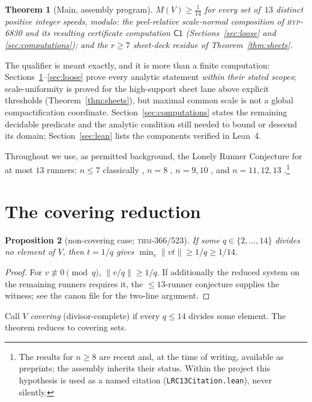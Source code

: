 \documentclass[11pt]{article}
\newtheorem{theorem}{Theorem}[section]
\newtheorem{proposition}[theorem]{Proposition}
\theoremstyle{definition}
\newcommand{\norm}[1]{\lVert #1\rVert}
\newcommand{\repo}[1]{\texttt{#1}}
\begin{document}
\begin{theorem}[Main, assembly program]\label{thm:main}
$M(V)\ge\tfrac1{14}$ for every set of\, $13$ distinct positive integer speeds, modulo:
the peel-relative scale-normal composition of \textsc{hyp}-6830 and its resulting
certificate computation $\mathsf{C1}$ (Sections~\ref{sec:loose} and
\ref{sec:computations}); and the $r\ge7$ sheet-deck residue of
Theorem~\ref{thm:sheets}.
\end{theorem}

The qualifier is meant exactly, and it is more than a finite computation:
Sections~\ref{sec:reduction}--\ref{sec:loose} prove every analytic statement \emph{within
their stated scopes}; scale-uniformity is proved for the high-support sheet lane above
explicit thresholds (Theorem~\ref{thm:sheets}), but maximal common scale is not a global
compactification coordinate. Section~\ref{sec:computations} states the remaining
decidable predicate and the analytic condition still needed to bound or descend its domain;
Section~\ref{sec:lean} lists the
components verified in Lean~4.

Throughout we use, as permitted background, the Lonely Runner Conjecture for at most $13$
runners: $n\le 7$ classically \cite{BHK,BarajasSerra}, $n=8$ \cite{Rosenfeld}, $n=9,10$
\cite{Trak}, and $n=11,12,13$ \cite{SungTrak}.\footnote{The results for $n\ge 8$ are recent
and, at the time of writing, available as preprints; the assembly inherits their status.
Within the project this hypothesis is used as a named citation (\repo{LRC13Citation.lean}),
never silently.}

\section{The covering reduction}\label{sec:reduction}

\begin{proposition}[non-covering case; \textsc{thm}-366/523]\label{prop:noncov}
If some $q\in\{2,\dots,14\}$ divides no element of $V$, then $t=1/q$ gives
$\min_v\norm{vt}\ge 1/q\ge 1/14$.
\end{proposition}

\begin{proof}
For $v\not\equiv 0 \pmod q$, $\norm{v/q}\ge 1/q$. If additionally the reduced system on the
remaining runners requires it, the $\le 13$-runner conjecture supplies the witness; see the
canon file for the two-line argument.
\end{proof}

Call $V$ \emph{covering} (divisor-complete) if every $q\le 14$ divides some element. The
theorem reduces to covering sets.
\end{document}
